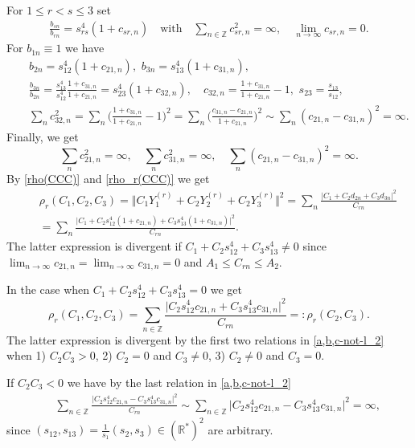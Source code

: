 \documentclass[preprint,12pt]{elsarticle}
\numberwithin{equation}{section}
\begin{document}
\begin{pf} 
 For $1\leq r<s\leq 3$  set 
 \begin{eqnarray*}
\frac{b_{sn}}{b_{rn}}\!=\!s^4_{rs}(1\!+\!c_{sr,n})\quad\text{with}\quad \sum_{n\in\mathbb Z}c^2_{sr,n}  =\infty,
\quad \lim_{n\to\infty}c_{sr,n}=0.
\end{eqnarray*}
For $b_{1n}\equiv 1$ we have
\begin{eqnarray*}
&&
b_{2n}=s^4_{12}(1+c_{21,n}),\,\,
b_{3n}=s^4_{13}(1+c_{31,n}),\,\,
\\
&&
\frac{b_{3n}}{b_{2n}}=\frac{s^4_{13}}{s^4_{12}}\frac{1+c_{31,n}}{1+c_{21,n}}=s^4_{23}(1+c_{32,n}),
\quad c_{32,n}=\frac{1+c_{31,n}}{1+c_{21,n}}-1,\,\,
s_{23}=\frac{s_{13}}{s_{12}},\\
&&
\sum_nc^2_{32,n}\! =\!\sum_n\Big(\frac{1+c_{31,n}}{1+c_{21,n}}\!-\!1\Big)^2\!\!
=\!\sum_n\Big(\frac{c_{31,n}\!-\!c_{21,n}}{1+c_{21,n}}\Big)^2\!\sim\!
\sum_n(c_{21,n}\!-\!c_{31,n})^2\!=\!\infty.
\end{eqnarray*}
Finally, we get
\begin{equation}
 \label{a,b,c-not-l_2}
\sum_nc_{21,n}^2=\infty,\quad \sum_nc_{31,n}^2=\infty,\quad \sum_n(c_{21,n}-c_{31,n})^2=\infty.
\end{equation}
%
By \eqref{rho(CCC)} and \eqref{rho_r(CCC)} we get
\begin{eqnarray*}
&&
\rho_r(C_1,C_2,C_3)\!=\!
\Vert C_1Y_1^{(r)}\!+\!C_2Y_2^{(r)}\!+\!C_2Y_3^{(r)}\Vert ^2\!=\!
\sum_n\frac{\vert C_1+C_2d_{2n}+C_3d_{3n}\vert^2}
 {C_{rn}} \\
 &&
 =\sum_n\frac{\vert C_1+C_2s^4_{12}(1+c_{21,n})+C_3s^4_{13}(1+c_{31,n})\vert^2}
 {C_{rn}}.
\end{eqnarray*}
The latter expression is divergent if $C_1+C_2s^4_{12}+C_3s^4_{13}\not=0$ since 
$\lim_{n\to\infty}c_{21,n}=\lim_{n\to\infty}c_{31,n}=0$ and $A_1\leq C_{rn}\leq A_2$. 


In the case  when $C_1+C_2s^4_{12}+C_3s^4_{13}=0$ we get
\begin{equation}
 \label{rho(CC)}
 \rho_r(C_1,C_2,C_3)=\sum_{n\in \mathbb Z}
 \frac{\vert C_2s^4_{12}c_{21,n}+C_3s^4_{13}c_{31,n}\vert^2}
 {C_{rn}}=:\rho_r(C_2,C_3).
\end{equation}
The latter expression is divergent by the first two relations in \eqref{a,b,c-not-l_2} when 1) $C_2C_3>0$, 2)
$C_2=0$ and $C_3\not=0$, 3)  $C_2\not=0$ and $C_3=0$. 

If $C_2C_3<0$ we have  by the last relation in \eqref{a,b,c-not-l_2}
\begin{eqnarray*}
&&
\sum_{n\in \mathbb Z}
 \frac{\vert C_2s^4_{12}c_{21,n}-C_3s^4_{13}c_{31,n}\vert^2}
 {C_{rn}}\sim 
 \sum_{n\in \mathbb Z}\vert C_2s^4_{12}c_{21,n}-C_3s^4_{13}c_{31,n}\vert^2=\infty,
\end{eqnarray*}
since $(s_{12},s_{13})=\frac{1}{s_1}(s_{2},s_{3})\in(\mathbb R^*)^2$ are arbitrary.


\end{pf}
\end{document}
